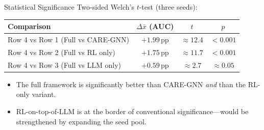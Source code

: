 \documentclass[aspectratio=169,10pt]{beamer}
\begin{document}
\begin{frame}{Statistical Significance}
    Two-sided Welch's $t$-test (three seeds):
    \vspace{0.4em}
    \begin{center}\small
    \begin{tabular}{@{}lccc@{}}
        \toprule
        \textbf{Comparison} & $\Delta\bar{x}$ \textbf{(AUC)} & $t$ & $p$ \\
        \midrule
        Row 4 vs Row 1 (Full vs CARE-GNN)   & $+1.99$\,pp & $\approx 12.4$ & \textcolor{positive}{\textbf{$< 0.001$}} \\
        Row 4 vs Row 2 (Full vs RL only)    & $+1.75$\,pp & $\approx 11.7$ & \textcolor{positive}{\textbf{$< 0.001$}} \\
        Row 4 vs Row 3 (Full vs LLM only)   & $+0.59$\,pp & $\approx 2.7$  & $\approx 0.05$ \\
        \bottomrule
    \end{tabular}
    \end{center}
    \vspace{0.6em}
    \begin{itemize}\small
        \item The full framework is significantly better than CARE-GNN \emph{and}
              than the RL-only variant.
        \item RL-on-top-of-LLM is at the border of conventional significance---would
              be strengthened by expanding the seed pool.
    \end{itemize}
\end{frame}
\end{document}
